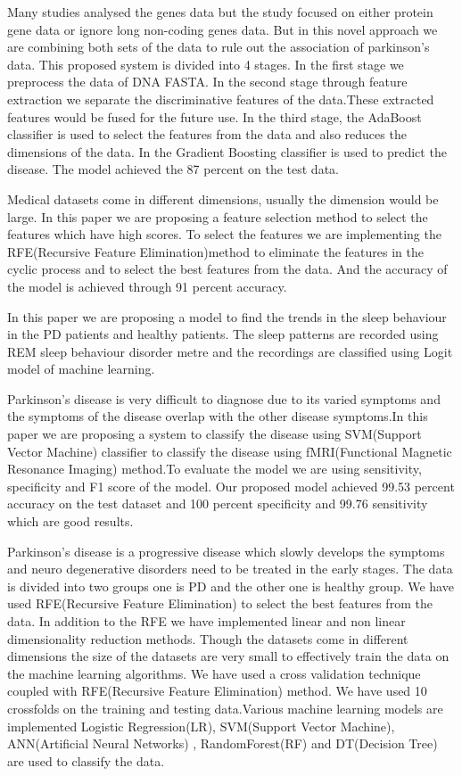 \documentclass[conference]{IEEEtran}
\begin{document}
Many studies analysed the genes data but the study focused on either protein gene data or ignore long non-coding genes data. But in this novel approach we are combining both sets of the data to rule out the association of parkinson's data. This proposed system is divided into 4 stages. In the first stage we preprocess the data of DNA FASTA. In the second stage through feature extraction we separate the discriminative features of the data.These extracted features would be fused for the future use. In the third stage, the AdaBoost classifier is used to select the features from the data and also reduces the dimensions of the data. In the Gradient Boosting classifier is used to predict the disease. The model achieved the 87 percent on the test data\cite{10032519}.

Medical datasets come in different dimensions, usually the dimension would be large. In this paper we are proposing a feature selection method to select the features which have high scores. To select the features we are implementing the RFE(Recursive Feature Elimination)method to eliminate the features in the cyclic process and to select the  best features from the data. And the accuracy of the model is achieved through 91 percent accuracy\cite{9791490}.

In this paper we are proposing a model to find the trends in the sleep behaviour in the PD patients and healthy patients. The sleep patterns are recorded using REM sleep behaviour disorder metre and the recordings are classified using Logit model of machine learning\cite{9230918}\cite{6944530}.

Parkinson's disease is very difficult to diagnose due to its varied symptoms and the symptoms of the disease overlap with the other disease symptoms.In this paper we are proposing a system to classify the disease using SVM(Support Vector Machine) classifier to classify the disease using fMRI(Functional Magnetic Resonance Imaging) method.To evaluate the model we are using sensitivity, specificity and F1 score of the model. Our proposed model achieved 99.53 percent accuracy on the test dataset and 100 percent specificity and 99.76 sensitivity which are good results\cite{8365279}\cite{8961441}.

Parkinson’s disease is a progressive disease which slowly develops the symptoms and neuro degenerative disorders need to be treated  in the early stages. The data is divided into two groups one is PD and the other one is healthy group. We have used RFE(Recursive Feature Elimination) to select the best features from the data. In addition to the RFE we have implemented linear and non linear dimensionality reduction methods\cite{9864672}\cite{5545301}.
Though the datasets come in different dimensions the size of the datasets are very small to effectively train the data on the machine learning algorithms. We have used a cross validation technique coupled with RFE(Recursive Feature Elimination) method. We have used 10 crossfolds on the training and testing data.Various machine learning models are implemented Logistic Regression(LR), SVM(Support Vector Machine), ANN(Artificial Neural Networks) , RandomForest(RF) and DT(Decision Tree) are used to classify the data\cite{9832191}\cite{7749257}.
\end{document}
